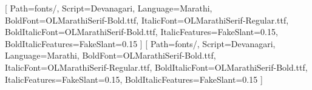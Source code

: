 \usepackage{iftex}
\RequireXeTeX
\relax
\usepackage[no-math]{fontspec}
\setmainfont{OLMarathiSerif-Regular.ttf}[
  Path=fonts/,
  Script=Devanagari,
  Language=Marathi,
  BoldFont=OLMarathiSerif-Bold.ttf,
  ItalicFont=OLMarathiSerif-Regular.ttf,
  BoldItalicFont=OLMarathiSerif-Bold.ttf,
  ItalicFeatures={FakeSlant=0.15},
  BoldItalicFeatures={FakeSlant=0.15}
]
\setsansfont{OLMarathiSerif-Regular.ttf}[
  Path=fonts/,
  Script=Devanagari,
  Language=Marathi,
  BoldFont=OLMarathiSerif-Bold.ttf,
  ItalicFont=OLMarathiSerif-Regular.ttf,
  BoldItalicFont=OLMarathiSerif-Bold.ttf,
  ItalicFeatures={FakeSlant=0.15},
  BoldItalicFeatures={FakeSlant=0.15}
]
\edef\slcRomanFamily{\rmdefault}
\AtEndPreamble{%
  \let\rmdefault\slcRomanFamily
  \normalfont
}
\linespread{1.18}
\setlength{\emergencystretch}{3em}
